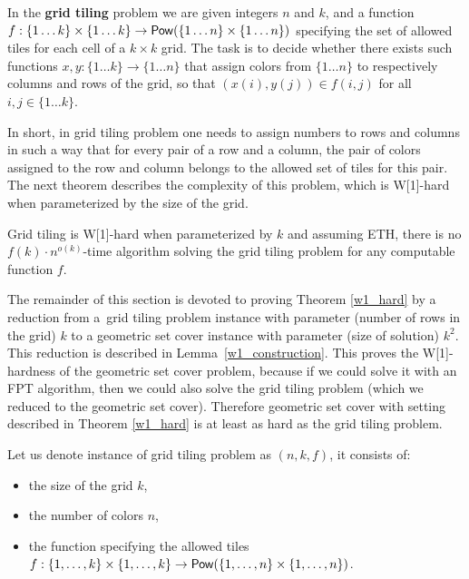 \begin{defi}
In the \textbf{grid tiling} problem we are given integers $n$ and $k$,
and a function
$f : \{1 \ldots k\} \times \{1 \ldots k\} \rightarrow \mathsf{Pow}(\{1 \ldots n\} \times \{1 \ldots n\})$
specifying the set of allowed tiles for each cell of a $k \times k$ grid.
The task is to decide whether there exists such functions
$x,y : \{1 \ldots k\} \rightarrow \{1 \ldots n\}$
that assign colors from $\{1 \ldots n\}$
to respectively columns and rows of the grid,
so that $(x(i), y(j)) \in f(i, j)$ for all $i,j \in \{1 \ldots k\}$.
\end{defi}

In short, in grid tiling problem one needs to assign numbers
to rows and columns in such a way
that for every pair of a row and a column,
the pair of colors assigned
to the row and column 
belongs to the allowed set of tiles for this pair.
The next theorem describes the complexity of this problem,
which is W[1]-hard when parameterized by the size of the grid.



\begin{tw}
\label{grid_tiling_w1_hard}
\textbf{\cite{marx_grid_tiling}}
Grid tiling is W[1]-hard when parameterized by $k$ and
assuming ETH, there is no $f(k)\cdot n^{o(k)}$-time
algorithm solving the grid tiling problem
for any computable function $f$.
\end{tw}

The remainder of this section is devoted to proving Theorem \ref{w1_hard}
by a reduction from a~grid tiling problem instance
with parameter (number of rows in the grid) $k$
to a geometric set cover instance with parameter (size of solution) $k^2$.
This reduction is described in Lemma~\ref{w1_construction}.
This proves the W[1]-hardness of the geometric set cover problem,
because if we could solve it with an FPT algorithm,
then we could also solve the grid tiling problem
(which we reduced to the geometric set cover).
Therefore geometric set cover with setting
described in Theorem \ref{w1_hard}
is at least as hard as the grid tiling problem.


\newcommand{\solWeight}{W_{hv} +k^2\delta }
\newcommand{\instanceSetCover}{(\points, \sets, w, 3k^2+2k)}
\newcommand{\instanceGridTiling}{(n,k,f)}
\newcommand{\yes}{\texttt{YES}}
\newcommand{\no}{\texttt{NO}}

Let us denote instance of grid tiling problem as $\instanceGridTiling$, it consists of:
\begin{itemize}
\item the size of the grid $k$,
\item the number of colors $n$,
\item the function specifying the allowed tiles
$f : \{1, \ldots, k\} \times \{1, \ldots, k\} \rightarrow \mathsf{Pow}(\{1, \ldots, n\} \times \{1, \ldots, n\})$.
\end{itemize}

